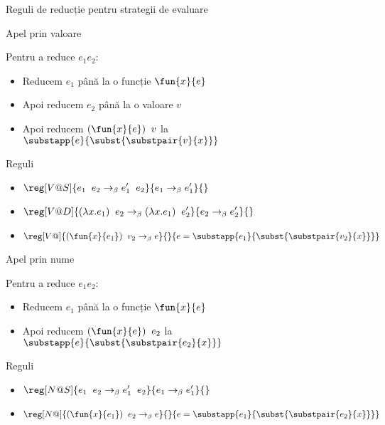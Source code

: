 \documentclass[xcolor=pdftex,romanian,colorlinks]{beamer}
\begin{document}
\begin{subsection}{Reguli de reducție pentru strategii de evaluare}


\begin{frame}{Apel prin valoare}
\begin{block}{}
Pentru a reduce $e_1 \mathrel{} e_2$:
\begin{itemize}
\item  Reducem $e_1$ până la o funcție
$\fun{x}{e}$
\item Apoi reducem $e_2$ până la o valoare $v$
\item Apoi reducem $(\fun{x}{e})\mathrel{}v$ la $\substapp{e}{\subst{\substpair{v}{x}}}$
\end{itemize}
\end{block}

\begin{block}{Reguli}
\begin{itemize}
\item[]$\displaystyle\reg[V@S]{e_1\mathrel{}e_2 \rightarrow_\beta e_1'\mathrel{}e_2}{e_1 \rightarrow_\beta e_1'}{}$
\item[]$\displaystyle\reg[V@D]{(\lambda x.e_1)\mathrel{}e_2 \rightarrow_\beta (\lambda x.e_1)\mathrel{}e_2'}{e_2 \rightarrow_\beta e_2'}{}$
\item[]$\reg[V@]{(\fun{x}{e_1})\mathrel{}v_2 \rightarrow_\beta e}{}{e = \substapp{e_1}{\subst{\substpair{v_2}{x}}}}$
\end{itemize}
\end{block}
\end{frame}

\begin{frame}{Apel prin nume} 
\begin{block}{}
Pentru a reduce $e_1 \mathrel{} e_2$:
\begin{itemize}
\item  Reducem $e_1$ până la o funcție $\fun{x}{e}$ 
\item Apoi reducem $(\fun{x}{e}) \mathrel{}e_2$ la $\substapp{e}{\subst{\substpair{e_2}{x}}}$
\end{itemize}
\end{block}

\begin{block}{Reguli}
\begin{itemize}
\item[]$\displaystyle\reg[N@S]{e_1\mathrel{}e_2 \rightarrow_\beta e_1'\mathrel{}e_2}{e_1 \rightarrow_\beta e_1'}{}$
\item[]$\reg[N@]{(\fun{x}{e_1})\mathrel{}e_2 \rightarrow_\beta e}{}{e = \substapp{e_1}{\subst{\substpair{e_2}{x}}}}$
\end{itemize}
\end{block}


\end{frame}
\end{subsection}
\end{document}
